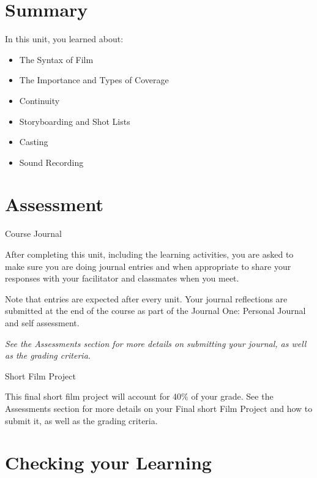 \documentclass[
]{book}
\providecommand{\tightlist}{%
  \setlength{\itemsep}{0pt}\setlength{\parskip}{0pt}}
\begin{document}
\hypertarget{summary-8}{%
\section*{Summary}\label{summary-8}}

In this unit, you learned about:

\begin{itemize}
\tightlist
\item
  The Syntax of Film\\
\item
  The Importance and Types of Coverage\\
\item
  Continuity\\
\item
  Storyboarding and Shot Lists\\
\item
  Casting\\
\item
  Sound Recording
\end{itemize}

\hypertarget{assessment-16}{%
\section*{Assessment}\label{assessment-16}}

\begin{assessment}
{Course Journal}

After completing this unit, including the learning activities, you are asked to make sure you are doing journal entries and when appropriate to share your responses with your facilitator and classmates when you meet.

Note that entries are expected after every unit. Your journal reflections are submitted at the end of the course as part of the Journal One: Personal Journal and self assessment.

\emph{See the Assessments section for more details on submitting your journal, as well as the grading criteria.}

{Short Film Project }

This final short film project will account for 40\% of your grade. See the Assessments section for more details on your Final short Film Project and how to submit it, as well as the grading criteria.
\end{assessment}

\hypertarget{checking-your-learning-8}{%
\section*{Checking your Learning}\label{checking-your-learning-8}}
\end{document}

